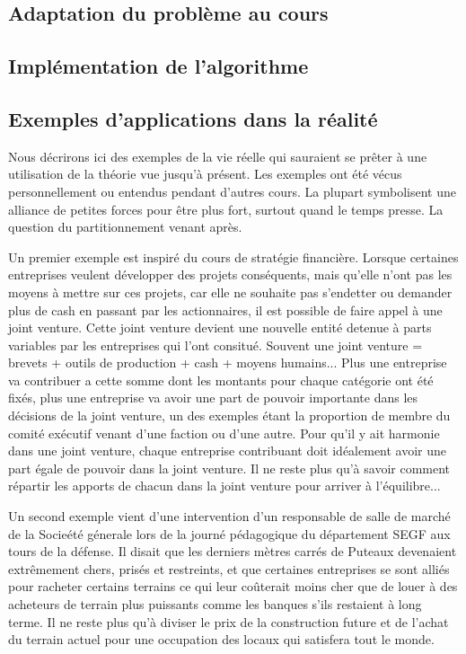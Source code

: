 \documentclass[12pt,twoside,a4paper]{article}
\begin{document}
\subsection{Adaptation du probl\`eme au cours}

\subsection{Impl\'ementation de l'algorithme}

\subsection{Exemples d'applications dans la r\'ealit\'e}

Nous décrirons ici des exemples de la vie r\'eelle qui sauraient se pr\^{e}ter \`a une utilisation de la th\'eorie vue jusqu'\`a présent. Les exemples ont \'et\'e v\'ecus personnellement ou entendus pendant d'autres cours. La plupart symbolisent une alliance de petites forces pour \^{e}tre plus fort, surtout quand le temps presse. La question du partitionnement venant après.

Un premier exemple est inspir\'e du cours de strat\'egie financi\`ere. Lorsque certaines entreprises veulent d\'evelopper des projets cons\'equents, mais qu'elle n'ont pas les moyens \`a mettre sur ces projets, car elle ne souhaite pas s'endetter ou demander plus de cash en passant par les actionnaires, il est possible de faire appel \`a une joint venture. Cette joint venture devient une nouvelle entit\'e detenue \`a parts variables par les entreprises qui l'ont consitu\'e. Souvent une joint venture = brevets + outils de production + cash + moyens humains... Plus une entreprise va contribuer a cette somme dont les montants pour chaque cat\'egorie ont \'et\'e fix\'es, plus une entreprise va avoir une part de pouvoir importante dans les d\'ecisions de la joint venture, un des exemples \'etant la proportion de membre du comit\'e ex\'ecutif venant d'une faction ou d'une autre. 
Pour qu'il y ait harmonie dans une joint venture, chaque entreprise contribuant doit id\'ealement avoir une part \'egale de pouvoir dans la joint venture. Il ne reste plus qu'\`a savoir comment r\'epartir les apports de chacun dans la joint venture pour arriver \`a l'\'equilibre...

Un second exemple vient d'une intervention d'un responsable de salle de march\'e de la Socie\'et\'e g\'enerale lors de la journ\'e p\'edagogique du d\'epartement SEGF aux tours de la d\'efense. Il disait que les derniers m\`etres carr\'es de Puteaux devenaient extr\^{e}mement chers, pris\'es et restreints, et que certaines entreprises se sont alli\'es pour racheter certains terrains ce qui leur co\^{u}terait moins cher que de louer \`a des acheteurs de terrain plus puissants comme les banques s'ils restaient \`a long terme. Il ne reste plus qu'\`a diviser le prix de la construction future et de l'achat du terrain actuel pour une occupation des locaux qui satisfera tout le monde.
\end{document}
